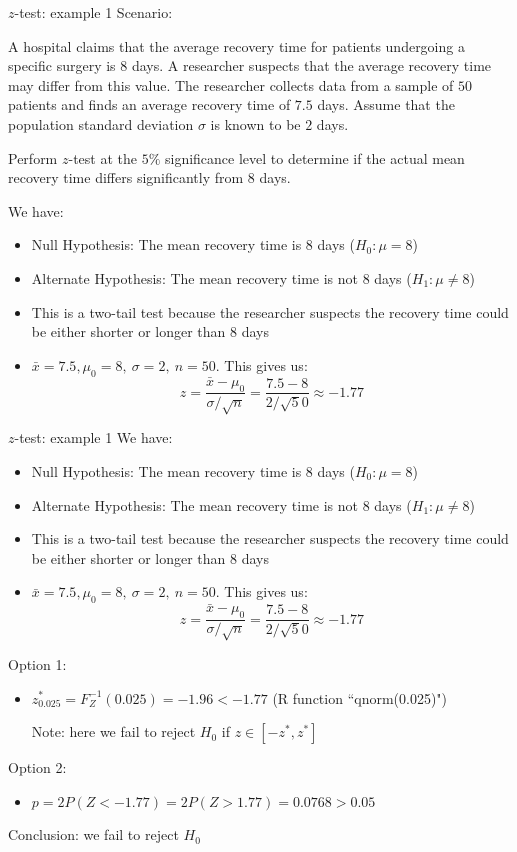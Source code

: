 \documentclass[t,8pt]{beamer}%
\begin{document}
\begin{frame}{$z$-test: example 1}
    Scenario: \par
    A hospital claims that the average recovery time for patients undergoing a specific surgery is $8$ days. A researcher suspects that the average recovery time may differ from this value. The researcher collects data from a sample of $5$0 patients and finds an average recovery time of $7.5$ days. Assume that the population standard deviation $\sigma$ is known to be $2$ days. \par
    
    Perform $z$-test at the $5\%$ significance level to determine if the actual mean recovery time differs significantly from $8$ days. \par
    We have:
    \begin{itemize}
        \item Null Hypothesis: The mean recovery time is $8$ days ($H_0:\mu=8$)
        \item Alternate Hypothesis: The mean recovery time is not $8$ days ($H_1:\mu\neq 8$)
        \item This is a two-tail test because the researcher suspects the recovery time could be either shorter or longer than 8 days
        \item $\bar x=7.5, \mu_0=8,\ \sigma=2,\ n=50$. This gives us:
        $$z=\frac{\bar x-\mu_0}{\sigma/\sqrt n}=\frac{7.5-8}{2/\sqrt 50}\approx -1.77$$
    \end{itemize}
\end{frame}

\begin{frame}{$z$-test: example 1}
    We have:
    \begin{itemize}
        \item Null Hypothesis: The mean recovery time is $8$ days ($H_0:\mu=8$)
        \item Alternate Hypothesis: The mean recovery time is not $8$ days ($H_1:\mu\neq 8$)
        \item This is a two-tail test because the researcher suspects the recovery time could be either shorter or longer than 8 days
        \item $\bar x=7.5, \mu_0=8,\ \sigma=2,\ n=50$. This gives us:
        $$z=\frac{\bar x-\mu_0}{\sigma/\sqrt n}=\frac{7.5-8}{2/\sqrt 50}\approx -1.77$$
    \end{itemize}
    Option 1:
    \begin{itemize}
        \item $z^*_{0.025}=F_Z^{-1}(0.025)=-1.96<-1.77$ (R function ``qnorm(0.025)") \par
        Note: here we fail to reject $H_0$ if $z\in[-z^*,z^*]$
    \end{itemize}
    Option 2:
    \begin{itemize}
        \item $p=2P(Z<-1.77)=2P(Z>1.77)=0.0768>0.05$
    \end{itemize}
    Conclusion: we fail to reject $H_0$
\end{frame}
\end{document}
